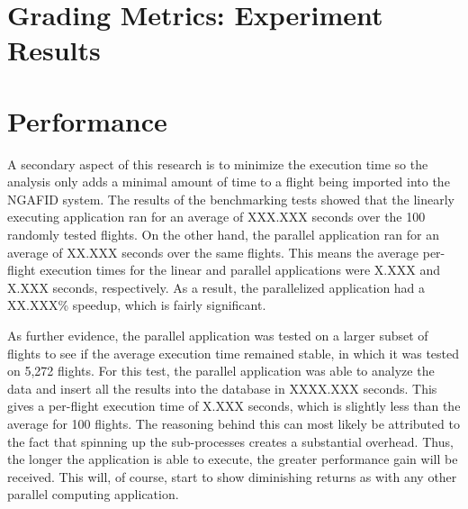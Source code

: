     
\section{Grading Metrics:  Experiment Results}



\section{Performance}

	A secondary aspect of this research is to minimize the execution time so  the analysis only adds a minimal amount of time to a flight being imported into the NGAFID system.  The results of the benchmarking tests showed that the linearly executing application ran for an average of XXX.XXX seconds over the 100 randomly tested flights.  On the other hand, the parallel application ran for an average of XX.XXX seconds over the same flights.  This means the average per-flight execution times for the linear and parallel applications were X.XXX and X.XXX seconds, respectively.  As a result, the parallelized application had a XX.XXX\% speedup, which is fairly significant.  %
    
    As further evidence, the parallel application was tested on a larger subset of flights to see if the average execution time remained stable, in which it was tested on 5,272 flights.  For this test, the parallel application was able to analyze the data and insert all the results into the database in XXXX.XXX seconds.  This gives a per-flight execution time of X.XXX seconds, which is slightly less than the average for 100 flights.  The reasoning behind this can most likely be attributed to the fact that spinning up the sub-processes creates a substantial overhead.  Thus, the longer the application is able to execute, the greater performance gain will be received.  This will, of course, start to show diminishing returns as with any other parallel computing application.
    
